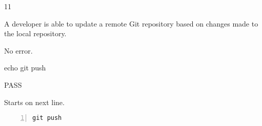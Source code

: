 \begin{description}[align=right,leftmargin=3.2cm,labelindent=3.0cm]
\item[Step:] 11
\item[Confirm:] A developer is able to update a remote Git repository based on changes made to the local repository.
\item[Expectation:] No error.
\item[Command:] echo git  push
\item[Test Result:] PASS
\item[Evidence:] Starts on next line.
\end{description}
\begin{lstlisting}[numbers=left]
git push

\end{lstlisting}

